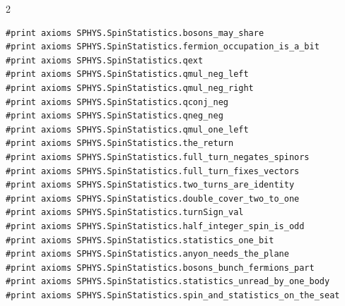 \documentclass[10pt]{article}
\begin{document}
\begin{multicols}{2}
\begin{Verbatim}[fontsize=\fontsize{6.0}{6.9}\selectfont,breaklines,breakanywhere,breaksymbolleft={}]
#print axioms SPHYS.SpinStatistics.bosons_may_share
#print axioms SPHYS.SpinStatistics.fermion_occupation_is_a_bit
#print axioms SPHYS.SpinStatistics.qext
#print axioms SPHYS.SpinStatistics.qmul_neg_left
#print axioms SPHYS.SpinStatistics.qmul_neg_right
#print axioms SPHYS.SpinStatistics.qconj_neg
#print axioms SPHYS.SpinStatistics.qneg_neg
#print axioms SPHYS.SpinStatistics.qmul_one_left
#print axioms SPHYS.SpinStatistics.the_return
#print axioms SPHYS.SpinStatistics.full_turn_negates_spinors
#print axioms SPHYS.SpinStatistics.full_turn_fixes_vectors
#print axioms SPHYS.SpinStatistics.two_turns_are_identity
#print axioms SPHYS.SpinStatistics.double_cover_two_to_one
#print axioms SPHYS.SpinStatistics.turnSign_val
#print axioms SPHYS.SpinStatistics.half_integer_spin_is_odd
#print axioms SPHYS.SpinStatistics.statistics_one_bit
#print axioms SPHYS.SpinStatistics.anyon_needs_the_plane
#print axioms SPHYS.SpinStatistics.bosons_bunch_fermions_part
#print axioms SPHYS.SpinStatistics.statistics_unread_by_one_body
#print axioms SPHYS.SpinStatistics.spin_and_statistics_on_the_seat
\end{Verbatim}
\end{multicols}
\end{document}
